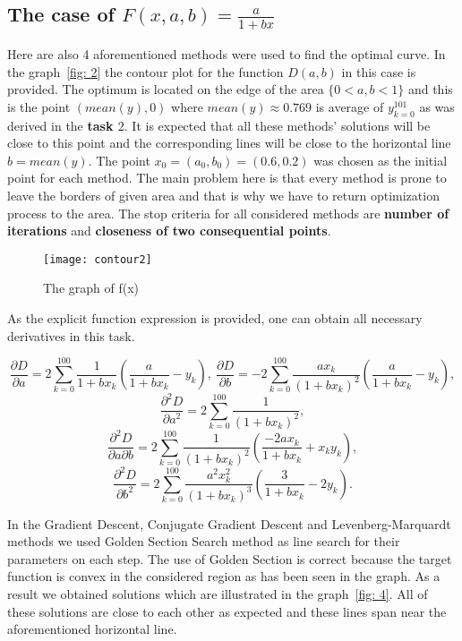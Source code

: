 \documentclass[12pt, bachelor, substylefile = algo_title.rtx]{disser}
\theoremstyle{definition}
\begin{document}
\subsection{The case of $F(x, a, b) = \frac{a}{1+bx}$}
Here are also 4 aforementioned methods were used to find the optimal curve. In the graph~\ref{fig: 2} the contour plot for the function $D(a,b)$ in this case is provided. The optimum is located on the edge of the area $\{0<a,b<1\}$ and this is the point $(mean(y), 0)$ where $mean(y) \approx 0.769$ is average of ${y}_{k=0}^{101}$ as was derived in the \textbf{task $2$}. It is expected that all these methods' solutions will be close to this point and the corresponding lines will be close to the horizontal line $b = mean(y)$. The point $x_0 = (a_0, b_0)=(0.6, 0.2)$ was chosen as the initial point for each method. The main problem here is that every method is prone to leave the borders of given area and that is why we have to return optimization process to the area. The stop criteria for all considered methods are \textbf{number of iterations} and \textbf{closeness of two consequential points}.

\begin{figure}[h]
\begin{center}
\texttt{[image: contour2]}
\caption{The graph of f(x)}
\label{fig: 3}
\end{center}
\end{figure}

As the explicit function expression is provided, one can obtain all necessary derivatives in this task.

$$ \frac{\partial D}{\partial a} = 2 \sum_{k=0}^{100}\frac{1}{1+bx_k}\left(\frac{a}{1+bx_k}-y_k\right),\ \frac{\partial D}{\partial b} = -2\sum_{k=0}^{100} \frac{ax_k}{(1+bx_k)^2}\left(\frac{a}{1+bx_k}-y_k\right), $$
$$ \frac{\partial^2 D}{\partial a^2} = 2\sum_{k=0}^{100} \frac{1}{(1+bx_k)^2},$$ $$ \frac{\partial^2 D}{\partial a \partial b} = 2\sum_{k=0}^{100} \frac{1}{(1+bx_k)^2} \left( \frac{-2ax_k}{1+bx_k} + x_ky_k \right),$$ $$ \frac{\partial^2 D}{\partial b^2} = 2\sum_{k=0}^{100} \frac{a^2x^2_k}{(1+bx_k)^3} \left( \frac{3}{1+bx_k} - 2y_k \right). $$

In the Gradient Descent, Conjugate Gradient Descent and Levenberg-Marquardt methods we used Golden Section Search method as line search for their parameters on each step. The use of Golden Section is correct because the target function is convex in the considered region as has been seen in the graph. As a result we obtained solutions which are illustrated in the graph~\ref{fig: 4}. All of these solutions are close to each other as expected and these lines span near the aforementioned horizontal line.
\end{document}
